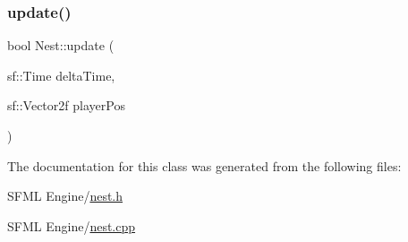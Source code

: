\subsubsection{\texorpdfstring{update()}{update()}}
{\footnotesize\ttfamily bool Nest\+::update (\begin{DoxyParamCaption}\item[{sf\+::\+Time}]{delta\+Time,  }\item[{sf\+::\+Vector2f}]{player\+Pos }\end{DoxyParamCaption})}



The documentation for this class was generated from the following files\+:\begin{DoxyCompactItemize}
\item 
S\+F\+M\+L Engine/\hyperlink{nest_8h}{nest.\+h}\item 
S\+F\+M\+L Engine/\hyperlink{nest_8cpp}{nest.\+cpp}\end{DoxyCompactItemize}

